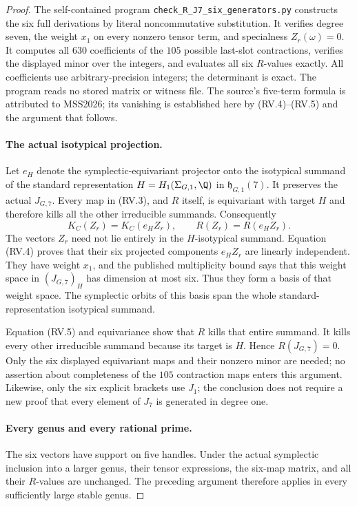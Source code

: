 \begin{proof}
The self-contained program
\texttt{check\_R\_J7\_six\_generators.py} constructs the
six full derivations by literal noncommutative substitution.
It verifies degree seven, the weight $x_1$ on every
nonzero tensor term, and specialness $Z_r(\omega)=0$.
It computes all $630$ coefficients of the $105$ possible
last-slot contractions, verifies the displayed minor over
the integers, and evaluates all six $R$-values exactly.
All coefficients use arbitrary-precision integers; the
determinant is exact. The program reads no stored matrix
or witness file. The source's five-term formula is
attributed to MSS2026\cite[Proposition~4.1, p.~11]{AuditMoritaSakasaiSuzuki2026v1};
its vanishing is established here by (RV.4)--(RV.5)
and the argument that follows.

\paragraph{The actual isotypical projection.}
Let $e_H$ denote the symplectic-equivariant projector
onto the isotypical summand of the standard representation
$H=H_1(\Sigma_{G,1},\Q)$ in $\mathfrak h_{G,1}(7)$.
It preserves the actual $J_{G,7}$. Every map in (RV.3),
and $R$ itself, is equivariant with target $H$ and
therefore kills all the other irreducible summands.
Consequently
\[
 K_C(Z_r)=K_C(e_HZ_r),\qquad R(Z_r)=R(e_HZ_r).
\]
The vectors $Z_r$ need not lie entirely in the $H$-isotypical
summand. Equation (RV.4) proves that their six projected
components $e_HZ_r$ are linearly independent. They have
weight $x_1$, and the published multiplicity bound says
that this weight space in $(J_{G,7})_H$ has dimension
at most six. Thus they form a basis of that weight space.
The symplectic orbits of this basis span the whole
standard-representation isotypical summand.

Equation (RV.5) and equivariance show that $R$ kills
that entire summand. It kills every other irreducible
summand because its target is $H$. Hence $R(J_{G,7})=0$.
Only the six displayed equivariant maps and their
nonzero minor are needed; no assertion about completeness
of the $105$ contraction maps enters this argument.
Likewise, only the six explicit brackets use $J_1$;
the conclusion does not require a new proof that every
element of $J_7$ is generated in degree one.

\paragraph{Every genus and every rational prime.}
The six vectors have support on five handles. Under
the actual symplectic inclusion into a larger genus,
their tensor expressions, the six-map matrix, and
all their $R$-values are unchanged. The preceding
argument therefore applies in every sufficiently
large stable genus.


\end{proof}
